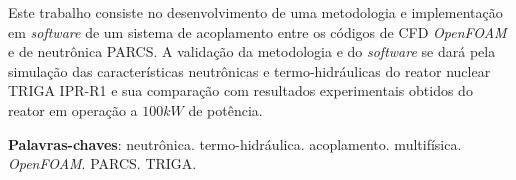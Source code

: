 \documentclass[12pt,openright,twoside,a4paper,english,french,spanish,brazil]{abntex2}
\begin{document}




\begin{resumo}

  Este trabalho consiste no desenvolvimento de uma metodologia e implementação 
em \textit{software} de um sistema de acoplamento entre os códigos de CFD 
\textit{OpenFOAM} e de neutrônica PARCS. A validação da metodologia e do 
\textit{software} se dará pela simulação das características neutrônicas e 
termo-hidráulicas do reator nuclear TRIGA IPR-R1 e sua comparação com resultados 
experimentais obtidos do reator em operação a $100 kW$ de potência.


 \vspace{\onelineskip}
    
 \noindent
 \textbf{Palavras-chaves}: neutrônica. termo-hidráulica. acoplamento. multifísica. \textit{OpenFOAM}. PARCS. TRIGA. 
\end{resumo}
\end{document}
